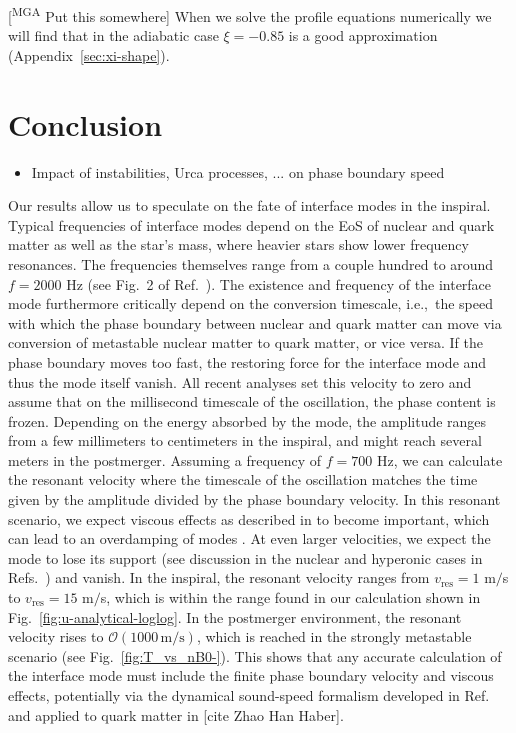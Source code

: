 \documentclass[10pt,superscriptaddress,
amsmath,aps,prc,twocolumn,nofootinbib,floatfix]{revtex4-1}
\newcommand{\com}[1]{{\sf\color[rgb]{0,0,1}[#1]}}
\newcommand{\mga}[1]{{\color[rgb]{0.6,0,0}#1}}
\newcommand{\mgacom}[1]{\textsf{\color[rgb]{0.8,0,0}[\textsuperscript{MGA} #1]}}
\newcommand{\new}[1]{{\color[rgb]{0.0,0.5,0.2}#1}}
\begin{document}
\mgacom{Put this somewhere}
\mga{When we solve the profile equations numerically we will find that in the adiabatic case $\xi=-0.85$ is a good approximation (Appendix~\ref{sec:xi-shape}).}


\section{Conclusion}
\label{sec:conclusion}
\begin{itemize}
    \item Impact of instabilities, Urca processes, ... on phase boundary speed
\end{itemize}
\new{Our results allow us to speculate on the fate of interface modes in the inspiral.  Typical frequencies of interface modes depend on the EoS of nuclear and quark matter as well as the star's mass, where heavier stars show lower frequency resonances. The frequencies themselves range from a couple hundred to around $f=2000$ Hz (see Fig.~2 of Ref.~\cite{Counsell:2025hcv}). The existence and frequency of the interface mode furthermore critically depend on the conversion timescale, i.e.,~the speed with which the phase boundary between nuclear and quark matter can move via conversion of metastable nuclear matter to quark matter, or vice versa. If the phase boundary moves too fast, the restoring force for the interface mode and thus the mode itself vanish. All recent analyses \cite{Tonetto:2020bie,Counsell:2025hcv,Pereira:2025xsi}  set this velocity to zero and assume that on the millisecond timescale of the oscillation, the phase content is frozen. Depending on the energy absorbed by the mode, the amplitude ranges from a few millimeters to centimeters in the inspiral, and might reach several meters in the postmerger. Assuming a frequency of $f=700$ Hz, we can calculate the resonant velocity where the timescale of the oscillation matches the time given by the amplitude divided by the phase boundary velocity. In this resonant scenario, we expect viscous effects as described in \cite{Alford:2014jha} to become important, which can lead to an overdamping of modes \cite{Ghosh:2026ldg}. At even larger velocities, we expect the mode to lose its support (see discussion in the nuclear and hyperonic cases in Refs.~\cite{Zhao:2025pgx, Ghosh:2026ldg}) and vanish. In the inspiral, the resonant velocity ranges from $v_\text{res}=1$ m$/$s to $v_\text{res}=15$ m$/$s, which is within the range found in our calculation shown in Fig.~\ref{fig:u-analytical-loglog}. In the postmerger environment, the resonant velocity rises to $\mathcal{O}(1000\, \text{m/s})$, which is reached in the strongly metastable scenario (see Fig.~\ref{fig:T_vs_nB0-}). This shows that any accurate calculation of the interface mode must include the finite phase boundary velocity and viscous effects, potentially via the dynamical sound-speed formalism developed in Ref.~\cite{Zhao:2025pgx} and applied to quark matter in \com{cite Zhao Han Haber}.

}
\end{document}
